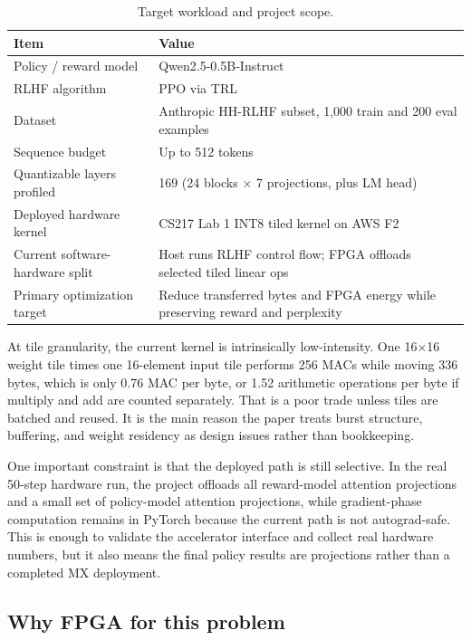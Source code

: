 \documentclass[11pt,a4paper]{article}
\begin{document}
\begin{table}[h!]
\centering
\small
\begin{tabular}{L{4.1cm}L{8.2cm}}
\toprule
\textbf{Item} & \textbf{Value} \\
\midrule
Policy / reward model & Qwen2.5-0.5B-Instruct \\
RLHF algorithm & PPO via TRL \\
Dataset & Anthropic HH-RLHF subset, 1,000 train and 200 eval examples \\
Sequence budget & Up to 512 tokens \\
Quantizable layers profiled & 169 (24 blocks $\times$ 7 projections, plus LM head) \\
Deployed hardware kernel & CS217 Lab 1 INT8 tiled kernel on AWS F2 \\
Current software-hardware split & Host runs RLHF control flow; FPGA offloads selected tiled linear ops \\
Primary optimization target & Reduce transferred bytes and FPGA energy while preserving reward and perplexity \\
\bottomrule
\end{tabular}
\caption{Target workload and project scope.}
\label{tab:workload-summary}
\end{table}

At tile granularity, the current kernel is intrinsically low-intensity. One 16\(\times\)16 weight tile times one 16-element input tile performs 256 MACs while moving 336 bytes, which is only 0.76 MAC per byte, or 1.52 arithmetic operations per byte if multiply and add are counted separately. That is a poor trade unless tiles are batched and reused. It is the main reason the paper treats burst structure, buffering, and weight residency as design issues rather than bookkeeping.

One important constraint is that the deployed path is still selective. In the real 50-step hardware run, the project offloads all reward-model attention projections and a small set of policy-model attention projections, while gradient-phase computation remains in PyTorch because the current path is not autograd-safe. This is enough to validate the accelerator interface and collect real hardware numbers, but it also means the final policy results are projections rather than a completed MX deployment.

\subsection{Why FPGA for this problem}
\end{document}
